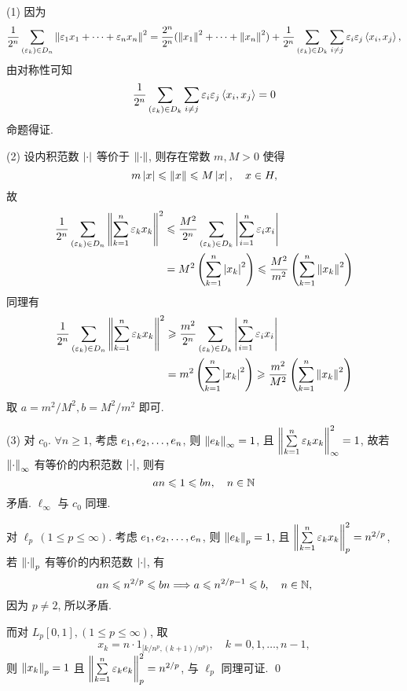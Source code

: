 	\begin{Proof}
		(1) 因为
		\[
			\frac{1}{2^{n}}\sum_{(\varepsilon_{k})\in D_{n}}\left\| \varepsilon_{1}x_{1}+\cdots+\varepsilon_{n}x_{n} \right\|^{2}=\frac{2^{n}}{2^{n}}(\left\| x_{1} \right\|^{2}+\cdots+\left\| x_{n} \right\|^{2})+\frac{1}{2^{n}}\sum_{(\varepsilon_{k})\in D_{k}}\sum_{i\ne j}\varepsilon_{i}\varepsilon_{j}\left\langle x_{i}, x_{j} \right\rangle,
		\]
		由对称性可知 
		\[
			\frac{1}{2^{n}}\sum_{(\varepsilon_{k})\in D_{k}}\sum_{i\ne j}\varepsilon_{i}\varepsilon_{j}\left\langle x_{i}, x_{j} \right\rangle=0
		\]
		命题得证. 

		(2) 设内积范数 $ \left| \cdot \right|  $ 等价于 $ \left\| \cdot \right\| $, 则存在常数 $ m, M>0 $ 使得
		\[
			m\left| x \right| \leqslant\left\| x \right\|\leqslant M\left| x \right| , \quad x\in H,
		\]
		故 
		\[
			\begin{aligned}
				\frac{1}{2^{n}}\sum_{(\varepsilon_{k})\in D_{n}}\left\| \sum_{k=1}^{n}\varepsilon_{k}x_{k} \right\|^{2} & \leqslant \frac{M^{2}}{2^{n}}\sum_{(\varepsilon_{k})\in D_{k}}\left| \sum_{i=1}^{n}\varepsilon_{i}x_{i} \right|   \\
				& = M^{2}\left(\sum_{k=1}^{n}\left| x_{k} \right| ^{2}\right)\leqslant \frac{M^{2}}{m^{2}}\left(\sum_{k=1}^{n}\left\| x_{k} \right\|^{2}\right)
			\end{aligned}
		\]
		同理有
		\[
			\begin{aligned}
				\frac{1}{2^{n}}\sum_{\left(\varepsilon_{k}\right)\in D_{n}}\left\| \sum_{k=1}^{n}\varepsilon_{k}x_{k} \right\|^{2} & \geqslant \frac{m^{2}}{2^{n}}\sum_{\left(\varepsilon_{k}\right)\in D_{k}}\left| \sum_{i=1}^{n}\varepsilon_{i}x_{i} \right|   \\
				 & = m^{2}\left(\sum_{k=1}^{n}\left| x_{k} \right| ^{2}\right)\geqslant \frac{m^{2}}{M^{2}}\left(\sum_{k=1}^{n}\left\| x_{k} \right\|^{2}\right)
			\end{aligned}
		\]
		取 $ a=m^{2}/M^{2}, b=M^{2}/m^{2} $ 即可. 

		(3) 对 $ c_{0} $. $ \forall n\geqslant1 $, 考虑 $ e_{1}, e_{2}, \dots, e_{n} $, 则 $ \left\| e_{k} \right\|_{\infty}=1 $, 且 $ \left\| \sum\limits_{k=1}^{n}\varepsilon_{k}x_{k} \right\|_{\infty}^{2}=1 $, 故若 $ \left\| \cdot \right\|_{\infty} $ 有等价的内积范数 $ \left| \cdot \right|  $, 则有
		\[
			an\leqslant1\leqslant bn, \quad n\in\mathbb{N}
		\]
		矛盾. $ \ell_{\infty} $ 与 $ c_{0} $ 同理. 

		对 $ \ell_{p}\,(1\leqslant p\leqslant\infty) $. 考虑 $ e_{1}, e_{2}, \dots, e_{n} $, 则 $ \left\| e_{k} \right\|_{p}=1 $, 且 $ \left\| \sum\limits_{k=1}^{n}\varepsilon_{k}x_{k} \right\|^{2}_{p}=n^{2/p} $, 若 $ \left\| \cdot \right\|_{p} $ 有等价的内积范数 $ \left| \cdot \right|  $, 有
		\[
			an\leqslant n^{2/p} \leqslant bn\Longrightarrow a\leqslant n^{2/p-1}\leqslant b, \quad n\in\mathbb{N},
		\]
		因为 $ p\ne 2 $, 所以矛盾. 

		而对 $ L_{p}[0, 1], (1\leqslant p\leqslant\infty) $, 取
		\[
			x_{k}=n\cdot1_{[{k}/{n^p}, ({k+1})/{n^p})}, \quad k = 0, 1, \dots, n-1,
		\]
		则 $ \left\| x_{k} \right\|_{p}=1 $ 且 $ \left\| \sum\limits_{k=1}^{n}\varepsilon_{k}e_{k} \right\|_{p}^{2}=n^{2/p} $, 与 $ \ell_{p} $ 同理可证. \qed
	\end{Proof}

